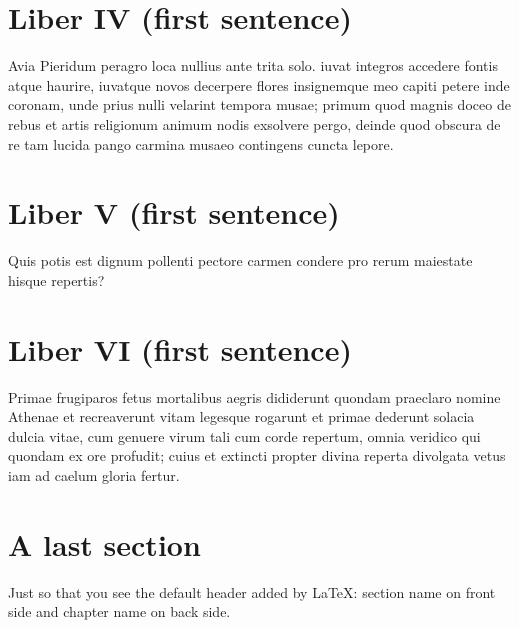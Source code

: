 \section{Liber IV (first sentence)}

Avia Pieridum peragro loca nullius ante
trita solo. iuvat integros accedere fontis
atque haurire, iuvatque novos decerpere flores
insignemque meo capiti petere inde coronam,
unde prius nulli velarint tempora musae;
primum quod magnis doceo de rebus et artis
religionum animum nodis exsolvere pergo,
deinde quod obscura de re tam lucida pango
carmina musaeo contingens cuncta lepore.

\section{Liber V (first sentence)}

Quis potis est dignum pollenti pectore carmen
condere pro rerum maiestate hisque repertis?


\section{Liber VI (first sentence)}

Primae frugiparos fetus mortalibus aegris
dididerunt quondam praeclaro nomine Athenae
et recreaverunt vitam legesque rogarunt
et primae dederunt solacia dulcia vitae,
cum genuere virum tali cum corde repertum,
omnia veridico qui quondam ex ore profudit;
cuius et extincti propter divina reperta
divolgata vetus iam ad caelum gloria fertur.

\newpage
\section{A last section}

Just so that you see the default header added by \LaTeX:
section name on front side and chapter name on back side.
